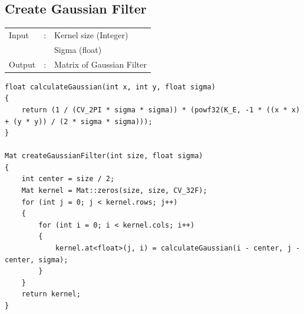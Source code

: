 \documentclass[12pt,a4paper]{report}
\begin{document}
\subsection{Create Gaussian Filter}
\begin{tabular}{lll}
  Input  & : & Kernel size (Integer)  \\
         &   & Sigma (float) \\
  Output & : & Matrix of Gaussian Filter \\
\end{tabular}
\begin{lstlisting}
float calculateGaussian(int x, int y, float sigma)
{
    return (1 / (CV_2PI * sigma * sigma)) * (powf32(K_E, -1 * ((x * x) + (y * y)) / (2 * sigma * sigma)));
}

Mat createGaussianFilter(int size, float sigma)
{
    int center = size / 2;
    Mat kernel = Mat::zeros(size, size, CV_32F);
    for (int j = 0; j < kernel.rows; j++)
    {
        for (int i = 0; i < kernel.cols; i++)
        {
            kernel.at<float>(j, i) = calculateGaussian(i - center, j - center, sigma);
        }
    }
    return kernel;
}
\end{lstlisting}
\end{document}
